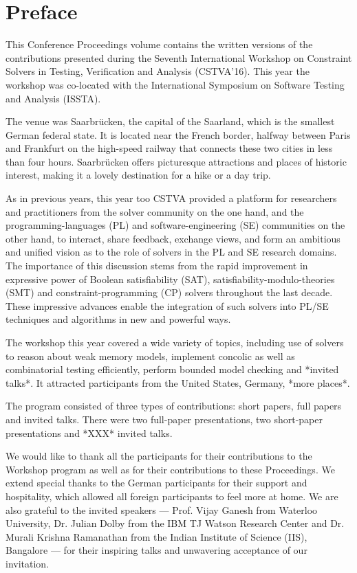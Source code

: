 \chapter*{Preface}
\setcounter{page}{1}
\pagestyle{plain}


This Conference Proceedings volume contains the written versions of the contributions presented during the Seventh International Workshop on Constraint Solvers in Testing, Verification and Analysis (CSTVA'16). This year the workshop was co-located with the International Symposium on Software Testing and Analysis (ISSTA). 

The venue was Saarbr{\"u}cken, the capital of the Saarland, which is the smallest German federal state. It is located near the French border, halfway between Paris and Frankfurt on the high-speed railway that connects these two cities in less than four hours. Saarbr{\"u}cken offers picturesque attractions and places of historic interest, making it a lovely destination for a hike or a day trip. 

As in previous years, this year too CSTVA provided a platform for researchers and practitioners from the solver community on the one hand, and the programming-languages (PL) and software-engineering (SE) communities on the other hand, to interact, share feedback, exchange views, and form an ambitious and unified vision as to the role of solvers in the PL and SE research domains. The importance of this discussion stems from 
the rapid improvement in expressive power of Boolean
satisfiability (SAT), satisfiability-modulo-theories (SMT) and constraint-programming (CP) solvers throughout the last decade. These impressive advances enable the integration of such solvers into PL/SE techniques and algorithms in new and powerful ways.

The workshop this year covered a wide variety of topics, including use of solvers to reason about weak memory models, implement concolic as well as combinatorial testing efficiently, perform bounded model checking and *invited talks*. It attracted participants from the United States, Germany, *more places*.

The program consisted of three types of contributions: short papers, full papers and invited talks. There were two full-paper presentations, two short-paper presentations and *XXX* invited talks.

We would like to thank all the participants for their contributions to the Workshop program as well as for their contributions to these Proceedings. We extend special thanks to the German participants for their support and hospitality, which allowed all foreign participants to feel more at home. We are also grateful to the invited speakers --- Prof. Vijay Ganesh from Waterloo University, Dr. Julian Dolby from the IBM TJ Watson Research Center and Dr. Murali Krishna Ramanathan from the Indian Institute of Science (IIS), Bangalore --- for their inspiring talks and unwavering acceptance of our invitation.

